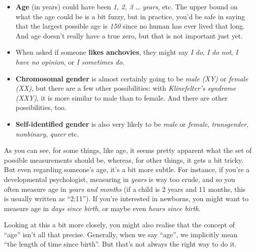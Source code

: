 \documentclass[
  11pt,
]{book}
\providecommand{\tightlist}{%
  \setlength{\itemsep}{0pt}\setlength{\parskip}{0pt}}
\theoremstyle{definition}
\theoremstyle{definition}
\theoremstyle{definition}
\theoremstyle{definition}
\theoremstyle{remark}
\begin{document}
\begin{itemize}
\tightlist
\item
  \textbf{Age} (in years) could have been \emph{1, 2, 3 \ldots{} years}, etc. The upper bound on what the age could be is a bit fuzzy, but in practice, you'd be safe in saying that the largest possible age is \emph{150} since no human has ever lived that long. And age doesn't really have a true zero, but that is not important just yet.
\item
  When asked if someone \textbf{likes anchovies}, they might say \emph{I do}, \emph{I do not}, \emph{I have no opinion}, or \emph{I sometimes do}.
\item
  \textbf{Chromosomal gender} is almost certainly going to be \emph{male (XY)} or \emph{female (XX)}, but there are a few other possibilities: with \emph{Klinefelter's syndrome (XXY)}, it is more similar to male than to female. And there are other possibilities, too.
\item
  \textbf{Self-identified gender} is also very likely to be \emph{male} or \emph{female}, \emph{transgender}, \emph{nonbinary}, \emph{queer} etc.
\end{itemize}

As you can see, for some things, like age, it seems pretty apparent what the set of possible measurements should be, whereas, for other things, it gets a bit tricky. But even regarding someone's age, it's a bit more subtle. For instance, if you're a developmental psychologist, measuring in \emph{years} is way too crude, and so you often measure age in \emph{years and months} (if a child is 2 years and 11 months, this is usually written as ``2;11''). If you're interested in newborns, you might want to measure age in \emph{days since birth}, or maybe even \emph{hours since birth}.

Looking at this a bit more closely, you might also realise that the concept of ``age'' isn't all that precise. Generally, when we say ``age'', we implicitly mean ``the length of time since birth''. But that's not always the right way to do it.
\end{document}
